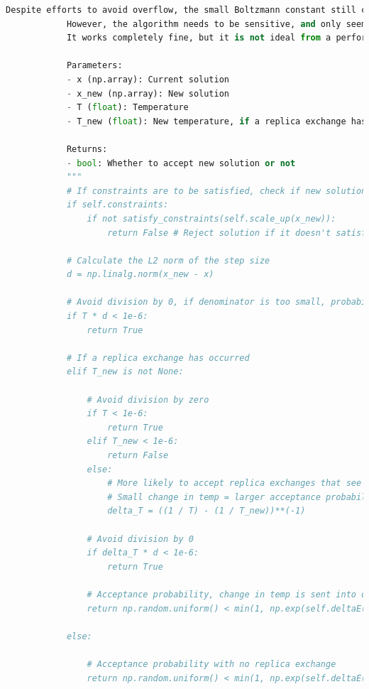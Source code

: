 \documentclass[10pt]{article}
\begin{document}
\begin{lstlisting}[language=Python, caption=PT.py, label=PTpy]
            Despite efforts to avoid overflow, the small Boltzmann constant still causes problems.
            However, the algorithm needs to be sensitive, and only seems to work with the inclusion of k.
            It works completely fine, but it is not ideal from a performance perspective. 
    
            Parameters:
            - x (np.array): Current solution
            - x_new (np.array): New solution
            - T (float): Temperature
            - T_new (float): New temperature, if a replica exchange has occurred
    
            Returns:
            - bool: Whether to accept new solution or not
            """
            # If constraints are to be satisfied, check if new solution satisfies constraints
            if self.constraints:
                if not satisfy_constraints(self.scale_up(x_new)):
                    return False # Reject solution if it doesn't satisfy constraints
    
            # Calculate the L2 norm of the step size
            d = np.linalg.norm(x_new - x)
    
            # Avoid division by 0, if denominator is too small, probability of acceptance is 1
            if T * d < 1e-6:
                return True
            
            # If a replica exchange has occurred
            elif T_new is not None:
                
                # Avoid division by zero
                if T < 1e-6:
                    return True
                elif T_new < 1e-6:
                    return False
                else:
                    # More likely to accept replica exchanges that see a small change in temperature
                    # Small change in temp = larger acceptance probability, p = exp(-deltaE / delta_T)
                    delta_T = ((1 / T) - (1 / T_new))**(-1)
    
                # Avoid division by 0
                if delta_T * d < 1e-6:
                    return True
                
                # Acceptance probability, change in temp is sent into denominator of acceptance probability
                return np.random.uniform() < min(1, np.exp(self.deltaE(x, x_new, d, delta_T)))
            
            else:
    
                # Acceptance probability with no replica exchange
                return np.random.uniform() < min(1, np.exp(self.deltaE(x, x_new, d, T)))
        

\end{lstlisting}
\end{document}
